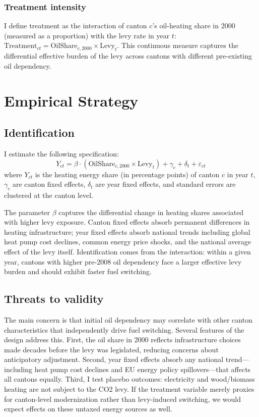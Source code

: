 \documentclass[12pt]{article}
\begin{document}
\subsubsection*{Treatment intensity} I define treatment as the interaction of canton $c$'s oil-heating share in 2000 (measured as a proportion) with the levy rate in year $t$: $\text{Treatment}_{ct} = \text{OilShare}_{c,2000} \times \text{Levy}_t$. This continuous measure captures the differential effective burden of the levy across cantons with different pre-existing oil dependency.




\section{Empirical Strategy}
\label{sec:strategy}

\subsection{Identification}

I estimate the following specification:
\begin{equation}
Y_{ct} = \beta \cdot (\text{OilShare}_{c,2000} \times \text{Levy}_t) + \gamma_c + \delta_t + \varepsilon_{ct}
\label{eq:main}
\end{equation}
where $Y_{ct}$ is the heating energy share (in percentage points) of canton $c$ in year $t$, $\gamma_c$ are canton fixed effects, $\delta_t$ are year fixed effects, and standard errors are clustered at the canton level.

The parameter $\beta$ captures the differential change in heating shares associated with higher levy exposure. Canton fixed effects absorb permanent differences in heating infrastructure; year fixed effects absorb national trends including global heat pump cost declines, common energy price shocks, and the national average effect of the levy itself. Identification comes from the interaction: within a given year, cantons with higher pre-2008 oil dependency face a larger effective levy burden and should exhibit faster fuel switching.

\subsection{Threats to validity}

The main concern is that initial oil dependency may correlate with other canton characteristics that independently drive fuel switching. Several features of the design address this. First, the oil share in 2000 reflects infrastructure choices made decades before the levy was legislated, reducing concerns about anticipatory adjustment. Second, year fixed effects absorb any national trend---including heat pump cost declines and EU energy policy spillovers---that affects all cantons equally. Third, I test placebo outcomes: electricity and wood/biomass heating are not subject to the CO2 levy. If the treatment variable merely proxies for canton-level modernization rather than levy-induced switching, we would expect effects on these untaxed energy sources as well.
\end{document}
